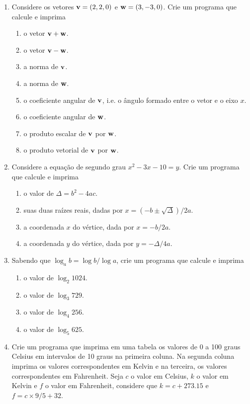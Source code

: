 \begin{enumerate}
  \item Considere os vetores ${\bf v} = (2, 2, 0)$ e ${\bf w} = (3, -3, 0)$. Crie um programa que calcule e imprima
    \begin{enumerate}
      \item o vetor ${\bf v} + {\bf w}$.
      \item o vetor ${\bf v} - {\bf w}$.
      \item a norma de ${\bf v}$.
      \item a norma de ${\bf w}$.
      \item o coeficiente angular de ${\bf v}$, i.e. o ângulo formado entre o vetor e o eixo $x$.
      \item o coeficiente angular de ${\bf w}$.
      \item o produto escalar de ${\bf v}$ por ${\bf w}$.
      \item o produto vetorial de ${\bf v}$ por ${\bf w}$.
    \end{enumerate}

  \item Considere a equação de segundo grau $x^2 - 3x - 10 = y$. Crie um programa que calcule e imprima
    \begin{enumerate}
      \item o valor de $\Delta = b^2 - 4ac$.
      \item suas duas raízes reais, dadas por $x = (-b \pm \sqrt{\Delta}) / 2a$.
      \item a coordenada $x$ do vértice, dada por $x = -b/2a$.
      \item a coordenada $y$ do vértice, dada por $y = -\Delta/4a$.
    \end{enumerate}

  \item Sabendo que $\log_a b = \log b / \log a$, crie um programa que calcule e imprima
    \begin{enumerate}
      \item o valor de $\log_2 1024$.
      \item o valor de $\log_3 729$.
      \item o valor de $\log_4 256$.
      \item o valor de $\log_5 625$.
    \end{enumerate}

  \item Crie um programa que imprima em uma tabela os valores de 0 a 100 graus Celsius em intervalos de 10 graus na primeira coluna. Na segunda coluna imprima os valores correspondentes em Kelvin e na terceira, os valores correspondentes em Fahrenheit. Seja $c$ o valor em Celsius, $k$ o valor em Kelvin e $f$ o valor em Fahrenheit, considere que $k = c + 273.15$ e $f = c \times 9 / 5 + 32$.

\end{enumerate}
